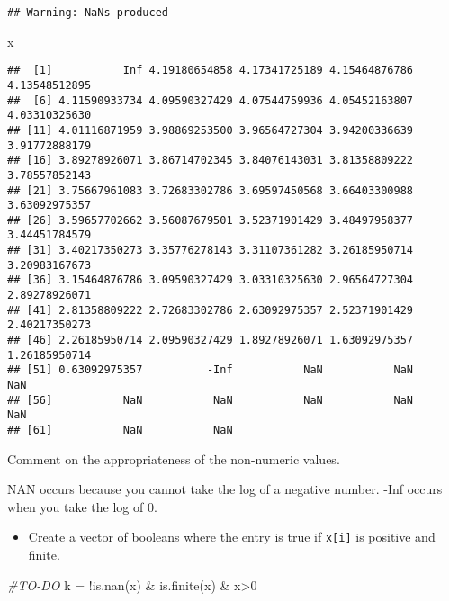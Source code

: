 \documentclass[
]{article}
\newenvironment{Shaded}{\begin{snugshade}}{\end{snugshade}}
\newcommand{\CommentTok}[1]{\textcolor[rgb]{0.56,0.35,0.01}{\textit{#1}}}
\newcommand{\DecValTok}[1]{\textcolor[rgb]{0.00,0.00,0.81}{#1}}
\newcommand{\FunctionTok}[1]{\textcolor[rgb]{0.00,0.00,0.00}{#1}}
\newcommand{\NormalTok}[1]{#1}
\newcommand{\OtherTok}[1]{\textcolor[rgb]{0.56,0.35,0.01}{#1}}
\newcommand{\SpecialCharTok}[1]{\textcolor[rgb]{0.00,0.00,0.00}{#1}}
\providecommand{\tightlist}{%
  \setlength{\itemsep}{0pt}\setlength{\parskip}{0pt}}
\begin{document}
\begin{verbatim}
## Warning: NaNs produced
\end{verbatim}

\begin{Shaded}
\begin{Highlighting}[]
\NormalTok{x}
\end{Highlighting}
\end{Shaded}

\begin{verbatim}
##  [1]           Inf 4.19180654858 4.17341725189 4.15464876786 4.13548512895
##  [6] 4.11590933734 4.09590327429 4.07544759936 4.05452163807 4.03310325630
## [11] 4.01116871959 3.98869253500 3.96564727304 3.94200336639 3.91772888179
## [16] 3.89278926071 3.86714702345 3.84076143031 3.81358809222 3.78557852143
## [21] 3.75667961083 3.72683302786 3.69597450568 3.66403300988 3.63092975357
## [26] 3.59657702662 3.56087679501 3.52371901429 3.48497958377 3.44451784579
## [31] 3.40217350273 3.35776278143 3.31107361282 3.26185950714 3.20983167673
## [36] 3.15464876786 3.09590327429 3.03310325630 2.96564727304 2.89278926071
## [41] 2.81358809222 2.72683302786 2.63092975357 2.52371901429 2.40217350273
## [46] 2.26185950714 2.09590327429 1.89278926071 1.63092975357 1.26185950714
## [51] 0.63092975357          -Inf           NaN           NaN           NaN
## [56]           NaN           NaN           NaN           NaN           NaN
## [61]           NaN           NaN
\end{verbatim}

Comment on the appropriateness of the non-numeric values.

NAN occurs because you cannot take the log of a negative number. -Inf
occurs when you take the log of 0.

\begin{itemize}
\tightlist
\item
  Create a vector of booleans where the entry is true if
  \texttt{x{[}i{]}} is positive and finite.
\end{itemize}

\begin{Shaded}
\begin{Highlighting}[]
\CommentTok{\#TO{-}DO}
\NormalTok{k }\OtherTok{=} \SpecialCharTok{!}\FunctionTok{is.nan}\NormalTok{(x) }\SpecialCharTok{\&} \FunctionTok{is.finite}\NormalTok{(x) }\SpecialCharTok{\&}\NormalTok{ x}\SpecialCharTok{\textgreater{}}\DecValTok{0}
\end{Highlighting}
\end{Shaded}
\end{document}
